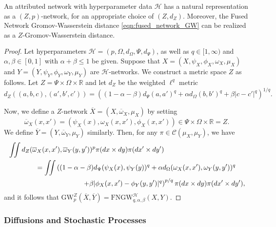 \documentclass[twoside,11pt]{article}
\theoremstyle{definition}
\newcommand{\R}{\mathbb{R}}
\begin{document}
\begin{proposition}\label{prop:FNGW_equals_ZGW}
An attributed network with hyperparameter data $\mathcal{H}$ has a natural representation as a $(Z,p)$-network, for an appropriate choice of $(Z,d_Z)$. Moreover, the Fused Network Gromov-Wasserstein distance  \eqref{eqn:fused_network_GW} can be realized as a $Z$-Gromov-Wasserstein distance.
\end{proposition}

\begin{proof}
    Let hyperparameters $\mathcal{H} = (p,\Omega,d_\Omega,\Psi,d_\Psi)$, as well as $q \in [1,\infty)$ and $\alpha,\beta \in [0,1]$ with $\alpha + \beta \leq 1$ be given. Suppose that  $X = (X,\psi_X,\phi_X,\omega_X,\mu_X)$ and $Y = (Y,\psi_Y,\phi_Y,\omega_Y,\mu_Y)$ are $\mathcal{H}$-networks. We construct a metric space $Z$ as follows. Let $Z = \Psi \times \Omega \times \R$ and let $d_Z$ be the weighted $\ell^q$ metric
    \[
    d_Z((a,b,c),(a',b',c')) = \left((1-\alpha-\beta)d_\Psi(a,a')^q + \alpha d_\Omega(b,b')^q + \beta |c - c'|^q\right)^{1/q}.
    \]

    Now, we define a $Z$-network $\overline{X} = (X,\overline{\omega}_X,\mu_X)$ by setting
    \[
    \overline{\omega}_X(x,x') = \left(\psi_X(x),\omega_X(x,x'),\phi_X(x,x')\right) \in \Psi \times \Omega \times \R = Z.
    \]
    We define $\overline{Y} = (Y,\overline{\omega}_Y,\mu_Y)$ similarly. Then, for any $\pi \in \mathcal{C}(\mu_X,\mu_Y)$, we have 
    \begin{align} 
         &\iint d_Z(\overline{\omega}_X(x,x'), \overline{\omega}_Y(y,y'))^p \pi(dx \times dy) \pi(dx' \times dy') \\
        &\qquad \qquad = \iint \left((1-\alpha-\beta)d_\Psi(\psi_X(x),\psi_Y(y))^q + \alpha d_\Omega(\omega_X(x,x'),\omega_Y(y,y'))^q \right.\\
        &\hspace{1.5in} \left. + \beta |\phi_X(x,x') - \phi_Y(y,y')|^q \right)^{p/q} \pi(dx \times dy)\pi(dx' \times dy'),
    \end{align}
    and it follows that $\mathrm{GW}_p^Z(\overline{X},\overline{Y}) = \mathrm{FNGW}^\mathcal{H}_{q,\alpha,\beta}(X,Y)$.
\end{proof}

\subsubsection{Diffusions and Stochastic Processes}
\end{document}
